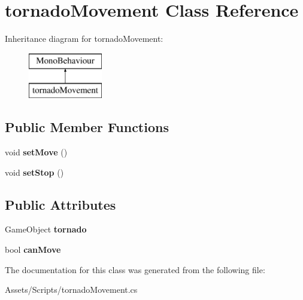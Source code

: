 \hypertarget{classtornado_movement}{}\section{tornado\+Movement Class Reference}
\label{classtornado_movement}
Inheritance diagram for tornado\+Movement\+:\begin{figure}[H]
\begin{center}
\leavevmode
\includegraphics[height=2.000000cm]{classtornado_movement}
\end{center}
\end{figure}
\subsection*{Public Member Functions}
\begin{DoxyCompactItemize}
\item 
void {\bfseries set\+Move} ()\hypertarget{classtornado_movement_a3b1a15b4bda9073c07447c61be5cc461}{}\label{classtornado_movement_a3b1a15b4bda9073c07447c61be5cc461}

\item 
void {\bfseries set\+Stop} ()\hypertarget{classtornado_movement_a0b376571a680bb4f4472f18701d7bfbf}{}\label{classtornado_movement_a0b376571a680bb4f4472f18701d7bfbf}

\end{DoxyCompactItemize}
\subsection*{Public Attributes}
\begin{DoxyCompactItemize}
\item 
Game\+Object {\bfseries tornado}\hypertarget{classtornado_movement_aeaadb73cee71f880f17537dfac0f5972}{}\label{classtornado_movement_aeaadb73cee71f880f17537dfac0f5972}

\item 
bool {\bfseries can\+Move}\hypertarget{classtornado_movement_ae3a24d1980d9d27b88e74cab7dc873a6}{}\label{classtornado_movement_ae3a24d1980d9d27b88e74cab7dc873a6}

\end{DoxyCompactItemize}


The documentation for this class was generated from the following file\+:\begin{DoxyCompactItemize}
\item 
Assets/\+Scripts/tornado\+Movement.\+cs\end{DoxyCompactItemize}
